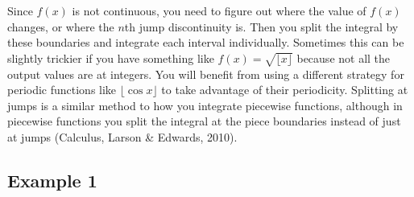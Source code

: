 \documentclass[12pt]{article}
\begin{document}
	\indent\indent Since $f(x)$ is not continuous, you need to figure out where the value of $f(x)$
	changes, or where the $n$th jump discontinuity is. Then you split the integral by these
	boundaries and integrate each interval individually. Sometimes this can be slightly trickier if
	you have something like $f(x)=\sqrt{\lfloor x\rfloor}$ because not all the output values are at
	integers. You will benefit from using a different strategy for periodic functions like $\lfloor
	\cos x\rfloor$ to take advantage of their periodicity. Splitting at jumps is a similar method
	to how you integrate piecewise functions, although in piecewise functions you split the
	integral at the piece boundaries instead of just at jumps (Calculus, Larson \& Edwards, 2010).

	\subsection*{Example 1}
\end{document}
